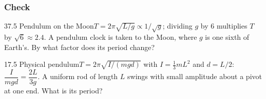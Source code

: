 \documentclass[11pt]{article}
\begin{document}
\subsubsection{Check}\mbox{}

\begin{q}{3}{7.5 Pendulum on the Moon}{$T = 2\pi\sqrt{L/g} \propto 1/\sqrt g$; dividing $g$ by 6 multiplies $T$ by $\sqrt6 \approx 2.4$.}
A pendulum clock is taken to the Moon, where $g$ is one sixth of Earth's. By what factor does its period change?
\end{q}
\begin{q}{1}{7.5 Physical pendulum}{$T = 2\pi\sqrt{I/(mgd)}$ with $I = \tfrac13 mL^2$ and $d = L/2$: $\dfrac{I}{mgd} = \dfrac{2L}{3g}$.}
A uniform rod of length $L$ swings with small amplitude about a pivot at one end. What is its period?
\end{q}

\makekey
\end{document}
